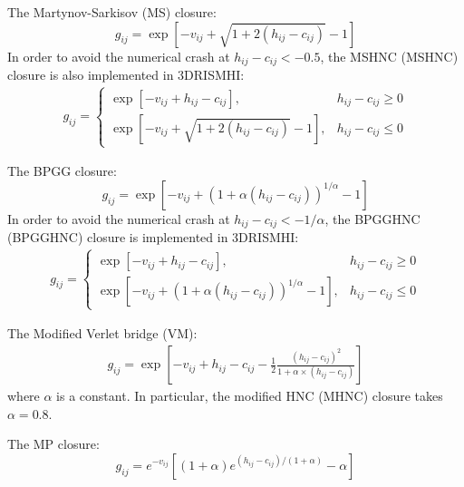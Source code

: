 \documentclass[aip,amsmath,amssymb,reprint,onecolumn]{revtex4-1}
\begin{document}
The Martynov-Sarkisov (MS) closure:
\begin{equation}\label{eq:MS}
    g_{ij} = \exp\left[ -v_{ij} + \sqrt{1 + 2(h_{ij} - c_{ij})} - 1\right]
\end{equation}
In order to avoid the numerical crash at $h_{ij} - c_{ij}<-0.5$, the MSHNC (MSHNC) closure is also implemented in 3DRISMHI:
\begin{equation}\begin{split}\label{eq:MSHNC}
    g_{ij} = \begin{cases}
        \exp\left[-v_{ij}+h_{ij}-c_{ij}\right], &h_{ij}-c_{ij}\ge 0\\
        \exp\left[ -v_{ij} + \sqrt{1 + 2(h_{ij} - c_{ij})} - 1\right], &h_{ij}-c_{ij}\le 0
    \end{cases}
\end{split}\end{equation}

The BPGG closure:
\begin{equation}\label{eq:BPGG}
    g_{ij} = \exp\left[ -v_{ij} + \left(1 + \alpha(h_{ij} - c_{ij})\right)^{1/\alpha} - 1\right]
\end{equation}
In order to avoid the numerical crash at $h_{ij} - c_{ij}<-1/\alpha$, the BPGGHNC (BPGGHNC) closure is implemented in 3DRISMHI:
\begin{equation}\begin{split}\label{eq:BPGGHNC}
    g_{ij} = \begin{cases}
        \exp\left[-v_{ij}+h_{ij}-c_{ij}\right], &h_{ij}-c_{ij}\ge 0\\
        \exp\left[ -v_{ij} + \left(1 + \alpha(h_{ij} - c_{ij})\right)^{1/\alpha} - 1\right], &h_{ij}-c_{ij}\le 0
    \end{cases}
\end{split}\end{equation}

The Modified Verlet bridge (VM):
\begin{equation}\begin{split}\label{eq:VM-and-MHNC}
    g_{ij} = \exp\left[-v_{ij} + h_{ij} - c_{ij} - \frac{1}{2}\frac{(h_{ij}-c_{ij})^2}{1 + \alpha\times(h_{ij}-c_{ij})}\right]
\end{split}\end{equation}
where $\alpha$ is a constant. In particular, the modified HNC (MHNC) closure takes $\alpha=0.8$.

The MP closure:
\begin{equation}\label{eq:MP}
    g_{ij} = e^{-v_{ij}}\left[ (1+\alpha)e^{(h_{ij}-c_{ij})/(1+\alpha)} - \alpha \right]
\end{equation}
\end{document}
